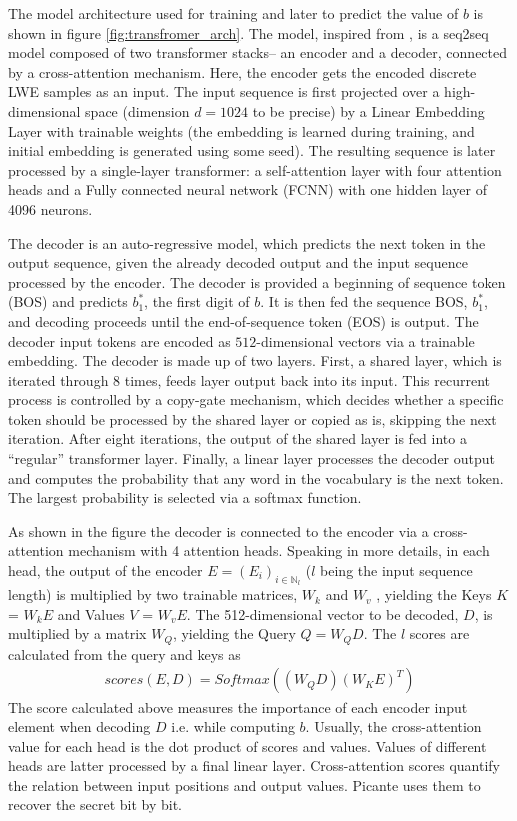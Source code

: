 The model architecture used for training and later to predict the value of $b$ is shown in figure \ref{fig:transfromer_arch}. The model, inspired from \cite{vaswani2017attention}, is a seq2seq model composed of two transformer stacks-- an encoder and a decoder, connected by a cross-attention mechanism. Here, the encoder gets the encoded discrete LWE samples as an input. The input sequence is first projected over a high-dimensional space (dimension $d=1024$ to be precise) by a Linear Embedding Layer with trainable weights (the embedding is learned during training, and initial embedding is generated using some seed). The resulting sequence is later processed by a single-layer transformer: a self-attention layer with four attention heads and a Fully connected neural network (FCNN) with one hidden layer of 4096 neurons.

The decoder is an auto-regressive model, which predicts the next token in the output sequence, given the already decoded output and the input sequence processed by the encoder. The decoder is provided a beginning of sequence token (BOS) and predicts $b_1^*$, the first digit of $b$. It is then fed the sequence BOS, $b_1^*$, and decoding proceeds until the end-of-sequence token (EOS) is output. The decoder input tokens are encoded as $512$-dimensional vectors via a trainable embedding. The decoder is made up of two layers. First, a shared layer, which is iterated through 8 times, feeds layer output back into its input. This recurrent process is controlled by a copy-gate mechanism, which decides whether a specific token should be processed by the shared layer or copied as is, skipping the next iteration. After eight iterations, the output of the shared layer is fed into a “regular” transformer layer. Finally, a linear layer processes the decoder output and computes the probability that any word in the vocabulary is the next token. The largest probability is selected via a softmax function.

As shown in the figure the decoder is connected to the encoder via a cross-attention mechanism with 4 attention heads. Speaking in more details, in each head, the output of the encoder $E=(E_i)_{i\in \mathbb{N}_l}$ ($l$ being the input sequence length) is multiplied by two trainable matrices, $W_k$ and $W_v$ , yielding the Keys $K$ = $W_k E$ and Values $V$ = $W_v E$. The 512-dimensional vector to be decoded, $D$, is multiplied by a matrix $W_Q$, yielding the Query $Q=W_Q D$. The $l$ scores are calculated from the query and keys as
\begin{align*}
    scores(E,D) = Softmax( (W_Q D) (W_K E)^T)
\end{align*}
The score calculated above measures the importance of each encoder input element when decoding $D$  i.e. while computing $b$. Usually, the cross-attention value for each head is the dot product of scores and values. Values of different heads are latter processed by a final linear layer. Cross-attention scores quantify the relation between input positions and output values. Picante uses them to recover the secret bit by bit.

